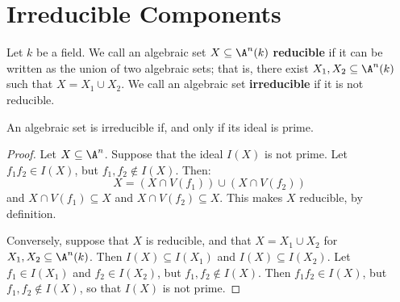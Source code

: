 \section{Irreducible Components}\label{section_10.3}

\begin{definition}
  Let $k$ be a field. We call an algebraic set $X \subseteq \A^n(k)$
  \textbf{reducible} if it can be written as the union of two algebraic sets;
  that is, there exist $X_1,X_2 \subseteq \A^n(k)$ such that $X=X_1 \cup X_2$.
  We call an algebraic set \textbf{irreducible} if it is not reducible.
\end{definition}

\begin{proposition}\label{proposition_10.3.1}
  An algebraic set is irreducible if, and only if its ideal is prime.
\end{proposition}
\begin{proof}
  Let $X \subseteq \A^n$. Suppose that the ideal $I(X)$ is not prime.
  Let $f_1f_2 \in I(X)$, but $f_1,f_2 \not\in I(X)$. Then:
  \begin{equation*}
    X=(X \cap V(f_1)) \cup (X \cap V(f_2))
  \end{equation*}
  and $X \cap V(f_1) \subseteq X$ and $X \cap V(f_2) \subseteq X$. This makes
  $X$ reducible, by definition.

  Conversely, suppose that $X$ is reducible, and that $X=X_1 \cup X_2$ for
  $X_1, X_2 \subseteq \A^n(k)$. Then $I(X) \subseteq I(X_1)$ and $I(X)
  \subseteq I(X_2)$. Let $f_1 \in I(X_1)$ and $f_2 \in I(X_2)$, but $f_1,f_2
  \not\in I(X)$. Then $f_1f_2 \in I(X)$, but $f_1,f_2 \not\in I(X)$, so that
  $I(X)$ is not prime.
\end{proof}

